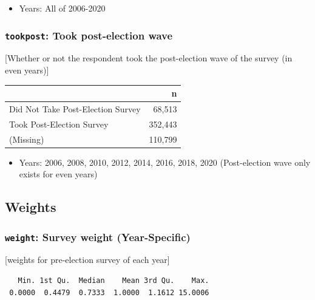 \documentclass[10pt,article,oneside]{memoir}
\theoremstyle{definition}
\begin{document}
\begin{itemize}
\tightlist
\item
  Years: All of 2006-2020
\end{itemize}

\hypertarget{tookpost-took-post-election-wave}{%
\subsubsection{\texorpdfstring{\texttt{tookpost}: Took post-election
wave}{tookpost: Took post-election wave}}\label{tookpost-took-post-election-wave}}

{[}Whether or not the respondent took the post-election wave of the
survey (in even years){]}

\begin{table}[H]
\centering
\begin{tabular}{lr}
\toprule
 & n\\
\midrule
Did Not Take Post-Election Survey & 68,513\\
Took Post-Election Survey & 352,443\\
(Missing) & 110,799\\
\bottomrule
\end{tabular}
\end{table}

\begin{itemize}
\tightlist
\item
  Years: 2006, 2008, 2010, 2012, 2014, 2016, 2018, 2020 (Post-election
  wave only exists for even years)
\end{itemize}

\hypertarget{weights}{%
\subsection{Weights}\label{weights}}

\hypertarget{weight-survey-weight-year-specific}{%
\subsubsection{\texorpdfstring{\texttt{weight}: Survey weight
(Year-Specific)}{weight: Survey weight (Year-Specific)}}\label{weight-survey-weight-year-specific}}

{[}weights for pre-election survey of each year{]}

\begin{verbatim}
   Min. 1st Qu.  Median    Mean 3rd Qu.    Max. 
 0.0000  0.4479  0.7333  1.0000  1.1612 15.0006 
\end{verbatim}
\end{document}
